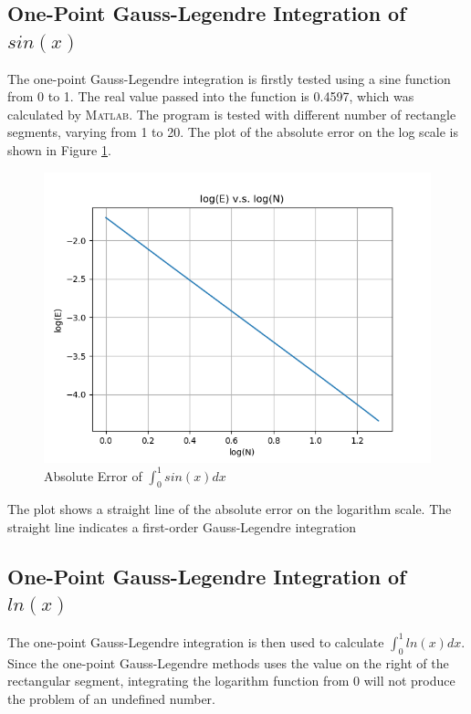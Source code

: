 \documentclass[a4paper,titlepage]{article}
\newcommand{\MATLAB}{\textsc{Matlab}\xspace}
\begin{document}
		\subsection{One-Point Gauss-Legendre Integration of $sin(x)$}
			The one-point Gauss-Legendre integration is firstly tested using a sine function from 0 to 1. The real value passed into the function is 0.4597, which was calculated by \MATLAB. The program is tested with different number of rectangle segments, varying from 1 to 20. The plot of the absolute error on the log scale is shown in Figure \ref{sine_err}.
			\begin{figure}[!h]
				\centering
				\includegraphics[width=\linewidth]{../data/sine_err_int}
				\caption{Absolute Error of $\int_{0}^{1}sin(x)dx$}
				\label{sine_err}
			\end{figure}
		
			The plot shows a straight line of the absolute error on the logarithm scale. The straight line indicates a first-order Gauss-Legendre integration
		\subsection{One-Point Gauss-Legendre Integration of $ln(x)$}
			The one-point Gauss-Legendre integration is then used to calculate $\int_{0}^{1} ln(x)dx$. Since the one-point Gauss-Legendre methods uses the value on the right of the rectangular segment, integrating the logarithm function from 0 will not produce the problem of an undefined number.
			
\end{document}
